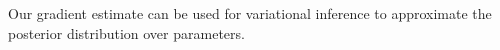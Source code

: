 \documentclass[9pt,twocolumn,twoside]{pnas-new}
\begin{document}
Our gradient estimate can be used for variational inference to approximate the posterior distribution over parameters. 









\end{document}
